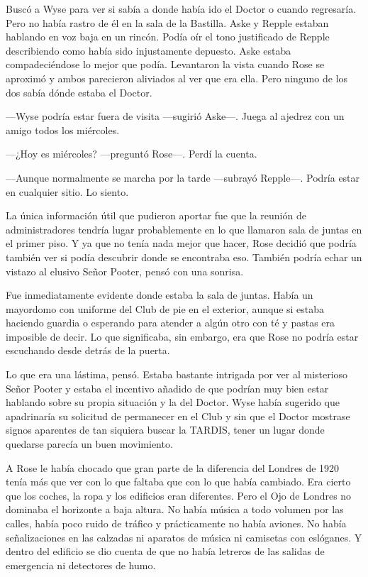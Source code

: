 {Buscó a Wyse para ver si sabía a donde había ido el Doctor o cuando
	regresaría. Pero no había rastro de él en la sala de la Bastilla. Aske y
	Repple estaban hablando en voz baja en un rincón. Podía oír el tono
	justificado de Repple describiendo como había sido injustamente
	depuesto. Aske estaba compadeciéndose lo mejor que podía. Levantaron la
	vista cuando Rose se aproximó y ambos parecieron aliviados al ver que
era ella. Pero ninguno de los dos sabía dónde estaba el Doctor.}

{---Wyse podría estar fuera de visita ---sugirió Aske---. Juega al
ajedrez con un amigo todos los miércoles.}

{---¿Hoy es miércoles? ---preguntó Rose---. Perdí la cuenta.}

{---Aunque normalmente se marcha por la tarde ---subrayó Repple---.
Podría estar en cualquier sitio. Lo siento.}

{La única información útil que pudieron aportar fue que la reunión de
	administradores tendría lugar probablemente en lo que llamaron sala de
	juntas en el primer piso. Y ya que no tenía nada mejor que hacer, Rose
	decidió que podría también ver si podía descubrir donde se encontraba
	eso. También podría echar un vistazo al elusivo Señor Pooter, pensó con
una sonrisa.}

{Fue inmediatamente evidente donde estaba la sala de juntas. Había un
	mayordomo con uniforme del Club de pie en el exterior, aunque si estaba
	haciendo guardia o esperando para atender a algún otro con té y pastas
	era imposible de decir. Lo que significaba, sin embargo, era que Rose no
podría estar escuchando desde detrás de la puerta.}

{Lo que era una lástima, pensó. Estaba bastante intrigada por ver al
	misterioso Señor Pooter y estaba el incentivo añadido de que podrían muy
	bien estar hablando sobre su propia situación y la del Doctor. Wyse
	había sugerido que apadrinaría su solicitud de permanecer en el Club y
	sin que el Doctor mostrase signos aparentes de tan siquiera buscar la
TARDIS, tener un lugar donde quedarse parecía un buen movimiento.}

{A Rose le había chocado que gran parte de la diferencia del Londres de
	1920 tenía más que ver con lo que faltaba que con lo que había cambiado.
	Era cierto que los coches, la ropa y los edificios eran diferentes. Pero
	el Ojo de Londres no dominaba el horizonte a baja altura. No había
	música a todo volumen por las calles, había poco ruido de tráfico y
	prácticamente no había aviones. No había señalizaciones en las calzadas
	ni aparatos de música ni camisetas con eslóganes. Y dentro del edificio
	se dio cuenta de que no había letreros de las salidas de emergencia ni
detectores de humo.}

